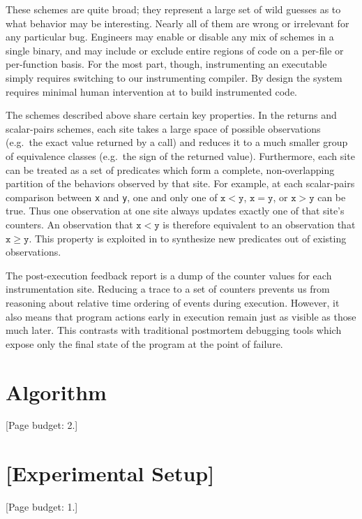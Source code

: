 \documentclass{acm_proc_article-sp}
\newcommand{\placeholder}[1]{{\color[cmyk]{0,0.61,0.87,0}[#1]}}
\begin{document}
These schemes are quite broad; they represent a large set of wild
guesses as to what behavior may be interesting.  Nearly all of them
are wrong or irrelevant for any particular bug.  Engineers may enable
or disable any mix of schemes in a single binary, and may include or
exclude entire regions of code on a per-file or per-function basis.
For the most part, though, instrumenting an executable simply requires
switching to our instrumenting compiler.  By design the system
requires minimal human intervention at to build instrumented code.

The schemes described above share certain key properties.  In the
returns and scalar-pairs schemes, each site takes a large space of
possible observations (e.g.\ the exact value returned by a call) and
reduces it to a much smaller group of equivalence classes (e.g.\ the
sign of the returned value).  Furthermore, each site can be treated as
a set of predicates which form a complete, non-overlapping partition
of the behaviors observed by that site.  For example, at each
scalar-pairs comparison between \texttt{x} and \texttt{y}, one and
only one of $\mathtt{x} < \mathtt{y}$, $\mathtt{x} = \mathtt{y}$, or
$\mathtt{x} > \mathtt{y}$ can be true.  Thus one observation at one
site always updates exactly one of that site's counters.  An
observation that $\mathtt{x} < \mathtt{y}$ is therefore equivalent to
an observation that $\mathtt{x} \ge \mathtt{y}$.  This property is
exploited in  to synthesize new predicates out
of existing observations.

The post-execution feedback report is a dump of the counter values for
each instrumentation site.  Reducing a trace to a set of counters
prevents us from reasoning about relative time ordering of events
during execution.  However, it also means that program actions early
in execution remain just as visible as those much later.  This
contrasts with traditional postmortem debugging tools which expose
only the final state of the program at the point of failure.

\section{Algorithm}
\label{sec:algorithm}

\placeholder{Page budget: 2.}



\section{\placeholder{Experimental Setup}}
\label{sec:experiments:setup}
\placeholder{Page budget: 1.}
\end{document}

